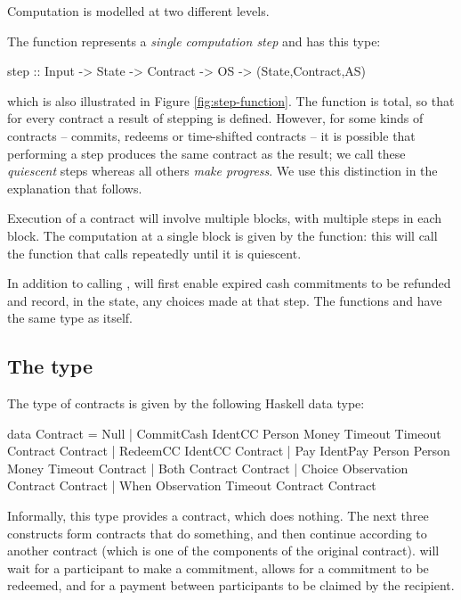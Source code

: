 \documentclass[runningheads]{llncs}
\begin{document}
Computation is modelled at two different levels. 

The  function represents a \emph{single computation step} and has this type:
\begin{haskellcode}
step :: Input -> State -> Contract -> OS -> (State,Contract,AS)
\end{haskellcode}
which is also illustrated in Figure \ref{fig:step-function}. 
The  function is total, so that for every contract a result of stepping is defined. However, for 
some kinds of contracts -- commits, redeems or time-shifted contracts -- it is possible that performing  a step 
produces the same contract as the result; we call these \emph{quiescent} steps whereas all others \emph{make 
progress}. We use this distinction in the explanation that follows.

Execution of a contract will involve multiple blocks, with multiple steps in each block. The computation at a single 
block is given by the  function: this will call the  function that calls 
 repeatedly until it is quiescent. 

In addition to calling ,  will first enable expired cash commitments to 
be refunded and record, in the state, any choices made at that step. The functions  and 
 have the same type as  itself.





\subsection{The  type}

The type of contracts is given by the following Haskell data type:

\begin{haskellcode}
data Contract =
   Null |
   CommitCash IdentCC Person Money Timeout Timeout Contract Contract |  
   RedeemCC IdentCC Contract |
   Pay IdentPay Person Person Money Timeout Contract |  
   Both Contract Contract |
   Choice Observation Contract Contract |
   When Observation Timeout Contract Contract   
   \end{haskellcode}
Informally, this type provides a  contract, which does nothing. The next three constructs form 
contracts that do something, and then continue according to another contract (which is one of the components of the 
original contract).  will wait for a participant to make a commitment, 
 allows for a commitment to be redeemed, and  for a payment between 
participants to be claimed by the recipient. 
\end{document}
